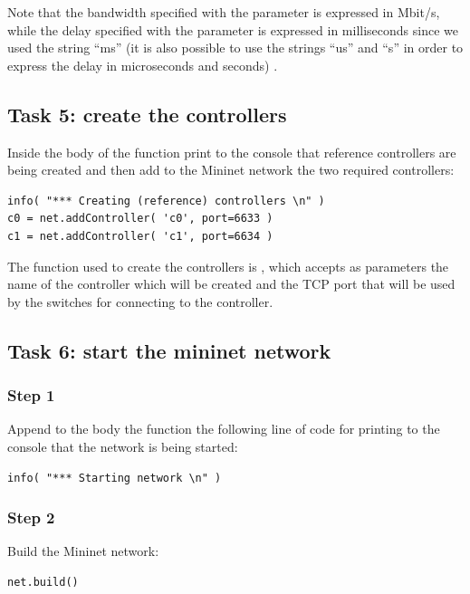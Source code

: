Note that the bandwidth specified with the parameter  is expressed in
Mbit/s, while the delay specified with the parameter  is expressed
in milliseconds since we used the string ``ms'' (it is also possible to use
the strings ``us'' and ``s'' in order to express the delay in microseconds and
seconds) \parencite{ref-7}.





\subsection*{Task 5: create the controllers}
Inside the body of the function  print to the console
that reference controllers are being created and then add to the Mininet network
the two required controllers:
\begin{lstlisting}
info( "*** Creating (reference) controllers \n" )
c0 = net.addController( 'c0', port=6633 )
c1 = net.addController( 'c1', port=6634 )
\end{lstlisting}

The function used to create the controllers is , which accepts
as parameters the name of the controller which will be created and the TCP port that
will be used by the switches for connecting to the controller.







\subsection*{Task 6: start the mininet network}
\subsubsection*{Step 1}
Append to the body the function  the following line
of code for printing to the console that the network is being started:
\begin{lstlisting}
info( "*** Starting network \n" )
\end{lstlisting}

\subsubsection*{Step 2}
Build the Mininet network:
\begin{lstlisting}
net.build()
\end{lstlisting}

